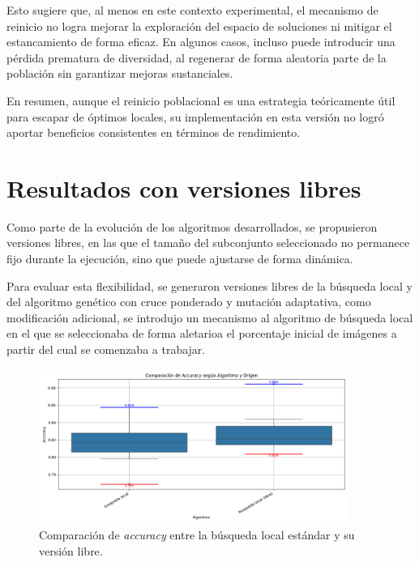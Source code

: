 Esto sugiere que, al menos en este contexto experimental, el mecanismo de reinicio no logra mejorar la exploración del espacio de soluciones
ni mitigar el estancamiento de forma eficaz.
En algunos casos, incluso puede introducir una pérdida prematura de diversidad, al regenerar de forma aleatoria parte de la población sin garantizar mejoras sustanciales.

En resumen, aunque el reinicio poblacional es una estrategia teóricamente útil para escapar de óptimos locales,
su implementación en esta versión no logró aportar beneficios consistentes en términos de rendimiento.

\section{Resultados con versiones libres}\label{sec:resultados-versiones-libres}
Como parte de la evolución de los algoritmos desarrollados, se propusieron versiones libres,
en las que el tamaño del subconjunto seleccionado no permanece fijo durante la ejecución, sino que puede ajustarse de forma dinámica.

Para evaluar esta flexibilidad, se generaron versiones libres de la búsqueda local y del algoritmo genético con cruce ponderado y mutación adaptativa,
como modificación adicional, se introdujo un mecanismo al algoritmo de búsqueda local
en el que se seleccionaba de forma aletarioa el porcentaje inicial de imágenes a partir del cual se comenzaba a trabajar.


\begin{figure}[htp]
    \centering
    \includegraphics[width=0.9\textwidth]{imagenes/evaluaciones/libres/comparacion_bl}
    \caption{Comparación de \textit{accuracy} entre la búsqueda local estándar y su versión libre.}
    \label{fig:bl_libre}
\end{figure}

